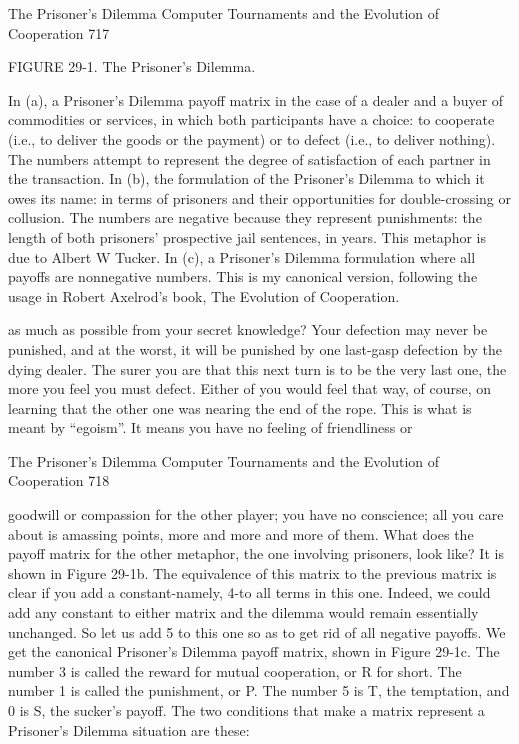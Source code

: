 The Prisoner's Dilemma Computer Tournaments and the Evolution of Cooperation              717

        FIGURE 29-1. The Prisoner's Dilemma.

        In (a), a Prisoner's Dilemma payoff matrix in the case of a dealer and a buyer of
commodities or services, in which both participants have a choice: to cooperate (i.e., to deliver
the goods or the payment) or to defect (i.e., to deliver nothing). The numbers attempt to represent
the degree of satisfaction of each partner in the transaction.
        In (b), the formulation of the Prisoner's Dilemma to which it owes its name: in terms of
prisoners and their opportunities for double-crossing or collusion. The numbers are negative
because they represent punishments: the length of both prisoners' prospective jail sentences, in
years. This metaphor is due to Albert W Tucker.
        In (c), a Prisoner's Dilemma formulation where all payoffs are nonnegative numbers.
This is my canonical version, following the usage in Robert Axelrod's book, The Evolution of
Cooperation.

as much as possible from your secret knowledge? Your defection may never be punished,
and at the worst, it will be punished by one last-gasp defection by the dying dealer.
        The surer you are that this next turn is to be the very last one, the more you feel
you must defect. Either of you would feel that way, of course, on learning that the other
one was nearing the end of the rope. This is what is meant by “egoism”. It means you
have no feeling of friendliness or




The Prisoner's Dilemma Computer Tournaments and the Evolution of Cooperation                  718

goodwill or compassion for the other player; you have no conscience; all you care about
is amassing points, more and more and more of them.
        What does the payoff matrix for the other metaphor, the one involving prisoners,
look like? It is shown in Figure 29-1b. The equivalence of this matrix to the previous
matrix is clear if you add a constant-namely, 4-to all terms in this one. Indeed, we could
add any constant to either matrix and the dilemma would remain essentially unchanged.
So let us add 5 to this one so as to get rid of all negative payoffs. We get the canonical
Prisoner's Dilemma payoff matrix, shown in Figure 29-1c. The number 3 is called the
reward for mutual cooperation, or R for short. The number 1 is called the punishment, or
P. The number 5 is T, the temptation, and 0 is S, the sucker's payoff. The two conditions
that make a matrix represent a Prisoner's Dilemma situation are these:

